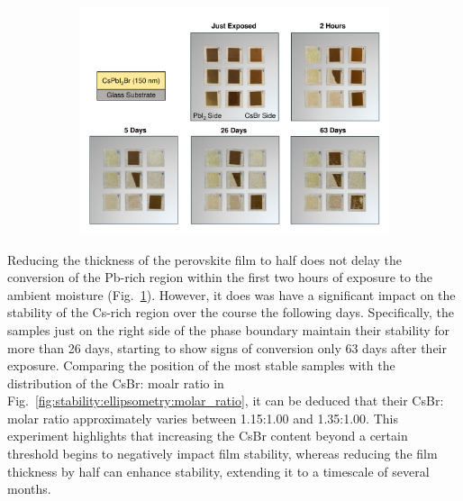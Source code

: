 \begin{figure}[htbp]
    \centering
    \begin{subfigure}[t]{0.99\textwidth}
        \centering
        \includegraphics[width=\textwidth]{chapters/stability/imeges/Stability_No_Rotation_139nm_on_glass.pdf} %
    \end{subfigure}

    \caption{}
    \label{fig:stability:no_rotation:150nm_glass}
\end{figure}

Reducing the thickness of the perovskite film to half does not delay the conversion of the Pb-rich region within the first two hours of exposure to the ambient moisture (Fig.~\ref{fig:stability:no_rotation:150nm_glass}). However, it does was have a significant impact on the stability of the Cs-rich region over the course the following days. Specifically, the samples just on the right side of the phase boundary maintain their stability for more than 26 days, starting to show signs of conversion only 63 days after their exposure. Comparing the position of the most stable samples with the distribution of the CsBr: moalr ratio in Fig.~\ref{fig:stability:ellipsometry:molar_ratio}, it can be deduced that their CsBr: molar ratio approximately varies between 1.15:1.00 and 1.35:1.00. This experiment highlights that increasing the CsBr content beyond a certain threshold begins to negatively impact film stability, whereas reducing the film thickness by half can enhance stability, extending it to a timescale of several months.

